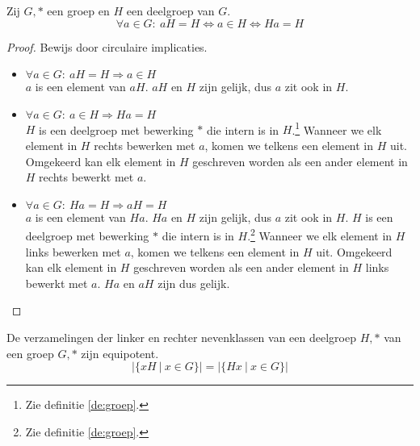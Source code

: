 \documentclass[main.tex]{subfiles}
\begin{document}
\begin{ei}
  Zij $G,*$ een groep en $H$ een deelgroep van $G$.
  \[ \forall a \in G:\ aH = H \Leftrightarrow a \in H \Leftrightarrow Ha = H \]

  \begin{proof}
    Bewijs door circulaire implicaties.
    \begin{itemize}
    \item $\forall a \in G:\ aH = H \Rightarrow a \in H$\\
      $a$ is een element van $aH$. $aH$ en $H$ zijn gelijk, dus $a$ zit ook in $H$.
    \item $\forall a \in G:\ a \in H \Rightarrow Ha = H$\\
      $H$ is een deelgroep met bewerking $*$ die intern is in $H$.\footnote{Zie definitie \ref{de:groep}.}
      Wanneer we elk element in $H$ rechts bewerken met $a$, komen we telkens een element in $H$ uit.
      Omgekeerd kan elk element in $H$ geschreven worden als een ander element in $H$ rechts bewerkt met $a$.
    \item $\forall a \in G:\ Ha = H \Rightarrow aH = H$\\
      $a$ is een element van $Ha$. $Ha$ en $H$ zijn gelijk, dus $a$ zit ook in $H$.
      $H$ is een deelgroep met bewerking $*$ die intern is in $H$.\footnote{Zie definitie \ref{de:groep}.}
      Wanneer we elk element in $H$ links bewerken met $a$, komen we telkens een element in $H$ uit.
      Omgekeerd kan elk element in $H$ geschreven worden als een ander element in $H$ links bewerkt met $a$.
      $Ha$ en $aH$ zijn dus gelijk.
    \end{itemize}
  \end{proof}
\end{ei}

\begin{st}
  De verzamelingen der linker en rechter nevenklassen van een deelgroep $H,*$ van een groep $G,*$ zijn equipotent.
  \[ |\{ xH\ |\ x \in G \}| = |\{ Hx\ |\ x \in G \}| \]
\end{st}
\end{document}
